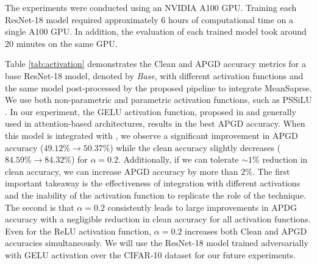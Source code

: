 \documentclass[conference]{IEEEtran}
\begin{document}
The experiments were conducted using an NVIDIA A100 GPU. Training each ResNet-18 model required approximately 6 hours of computational time on a single A100 GPU. In addition, the evaluation of each trained model took around 20 minutes on the same GPU.

Table \ref{tab:activation} demonstrates the Clean and APGD accuracy metrics for a base ResNet-18 model, denoted by \emph{Base}, with different activation functions and the same model post-processed by the proposed pipeline to integrate MeanSaprse. We use both non-parametric and parametric activation functions, such as PSSiLU \cite{pafdm22}. In our experiment, the GELU activation function, proposed in \cite{gelhg18} and generally used in attention-based architectures, results in the best APGD accuracy. When this model is integrated with \sys, we observe a significant improvement in APGD accuracy ($49.12\%\rightarrow50.37\%$) while the clean accuracy slightly decreases ($84.59\%\rightarrow84.32\%$) for $\alpha=0.2$. Additionally, if we can tolerate $\sim1\%$ reduction in clean accuracy, we can increase APGD accuracy by more than $2\%$. The first important takeaway is the effectiveness of \sys integration with different activations and the inability of the activation function to replicate the role of the \sys technique. The second is that $\alpha=0.2$ consistently leads to large improvements in APDG accuracy with a negligible reduction in clean accuracy for all activation functions. Even for the ReLU activation function, $\alpha=0.2$ increases both Clean and APGD accuracies simultaneously.
We will use the ResNet-18 model trained adversarially with GELU activation over the CIFAR-10 dataset for our future experiments.
\end{document}

